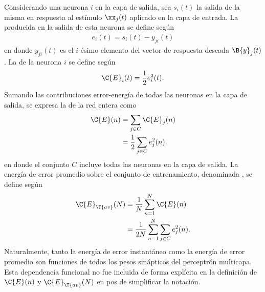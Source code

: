 Considerando una neurona $i$ en la capa de salida, sea $s_i(t)$ la
salida de la misma en respuesta al estímulo $\xx_j(t)$ aplicado en la
capa de entrada. La  producida en la salida de esta
neurona se define según
%
\begin{align}
\label{4.2}
  e_i(t)=s_{i}(t)-y_{ji}(t)
\end{align}
%
en donde $y_{ji}(t)$ es el $i$-ésimo elemento del vector de respuesta
deseada $\B{y}_j(t)$. La  de la neurona
$i$ se define según
%
\begin{align}
\label{4.3}
  \C{E}_i(t)=\frac{1}{2}e^2_i(t).
\end{align}
%
Sumando las contribuciones error-energía de todas las neuronas en la
capa de salida, se expresa la 
de la red entera como
%
\begin{align}
\label{4.4}
  \C{E}(n)&=\sum_{j\in C}\C{E}_j(n) \\
  &=\frac{1}{2}\sum_{j\in C}e^2_j(n).
\end{align}
%
en donde el conjunto $C$ incluye todas las neuronas en la capa de
salida. La energía de error promedio sobre el conjunto de entrenamiento,
denominada , se define según
%
\begin{align}
\label{4.5}
  \C{E}_{\T{av}}(N)&=\frac{1}{N}\sum_{n=1}^N\C{E}(n) \\
  &=\frac{1}{2N} \sum_{n=1}^N \sum_{j\in C}e^2_j(n).
\end{align}
%
Naturalmente, tanto la energía de error instantáneo como la energía de
error promedio son funciones de todos los pesos sinápticos del
perceptrón multicapa. Esta dependencia funcional no fue incluida de
forma explícita en la definición de $\C{E}(n)$ y $\C{E}_{\T{av}}(N)$
en pos de simplificar la notación.
%
